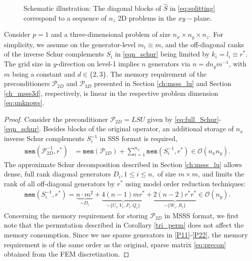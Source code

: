 {\begin{figure}[ht]
    \caption{Schematic illustration: The diagonal blocks of $\hat{S}$ in \eqref{eq:splitting} correspond to a sequence of $n_z$ 2D problems in the $xy-$plane.} \label{fig:3dscheme}
\end{figure}
\begin{corollary}\label{mem_3d}
Consider \mbox{$p=1$} and a three-dimensional problem of size $n_x \times n_y \times n_z$. For simplicity, we assume on the generator-level $m_i \equiv m$, and the off-diagonal ranks of the inverse Schur complements $S_i$ in \eqref{eqn_schur} being limited by $k_i = l_i\equiv r^\ast$. The grid size in $y$-direction on level-1 implies $n$ generators via $n = d n_y m^{-1}$, with $m$ being a constant and $d \in \{2,3\}$. The memory requirement of the preconditioners $\mathcal{P}_{2D}$ and $\mathcal{P}_{3D}$ presented in Section \ref{ch:msss_lu} and Section \ref{ch_msss3d}, respectively, is linear in the respective problem dimension \eqref{eq:unknows}.
\end{corollary}
\begin{proof}
Consider the preconditioner $\mathcal{P}_{2D}=LSU$ given by \eqref{eq:full_Schur}-\eqref{eqn_schur}. Besides blocks of the original operator, an additional storage of $n_x$ inverse Schur complements $S_i^{-1}$ in SSS format is required,
\begin{align*}
 \texttt{mem}(\mathcal{P}_{2D}^{-1},r^\ast) &= \texttt{mem}(\mathcal{P}_{2D})  + \sum_{i=1}^{n_x} \texttt{mem}(S_{i}^{-1},r^\ast) \in \mathcal{O}(n_xn_y).
\end{align*}
The approximate Schur decomposition described in Section \ref{ch:msss_lu} allows dense, full rank diagonal generators $D_i, 1 \leq i \leq n,$ of size $m \times m$, and limits the rank of all off-diagonal generators by $r^\ast$ using model order reduction techniques:
\begin{align*}
\texttt{mem}(S_{i}^{-1},r^\ast) = \underbrace{n \cdot m^2}_{\sim D_i} + \underbrace{4(n-1)mr^\ast}_{\sim \{U_i,V_i,P_i,Q_i\}} + \underbrace{2(n-2)r^\ast r^\ast}_{\sim \{W_i,R_i\}} \in \mathcal{O}(n_y).
\end{align*}
Concerning the memory requirement for storing $\mathcal{P}_{2D}$ in MSSS format, we first note that the permutation described in Corollary \ref{tri_perm} does not affect the memory consumption. Since we use sparse generators in \eqref{P11}-\eqref{P22}, the memory requirement is of the same order as the original, sparse matrix \eqref{eq:precon} obtained from the FEM discretization.


\end{proof}}
